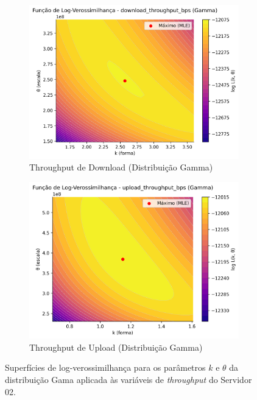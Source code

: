 \documentclass{article}
\begin{document}
\begin{figure}[htp]
	\centering
	\begin{subfigure}[b]{0.48\textwidth} %
		\includegraphics[width=\textwidth]{../figures/mle/download_throughput_bps_loglik_surface_gamma_server02.png}
		\caption{Throughput de Download (Distribuição Gamma)}
		\label{fig:download_throughput_bps_loglik_surface_gamma_server02}
	\end{subfigure}
	\hfill 
	\begin{subfigure}[b]{0.48\textwidth}
		\includegraphics[width=\textwidth]{../figures/mle/upload_throughput_bps_loglik_surface_gamma_server02.png}
		\caption{Throughput de Upload (Distribuição Gamma)}
		\label{fig:upload_throughput_bps_loglik_surface_gamma_server02}
	\end{subfigure}
	\caption{Superfícies de log-verossimilhança para os parâmetros $k$ e $\theta$ da distribuição Gama aplicada às variáveis de \textit{throughput} do Servidor 02.}
	\label{fig:throughput_gamma_loglik_combined_server02}
\end{figure}
\end{document}
